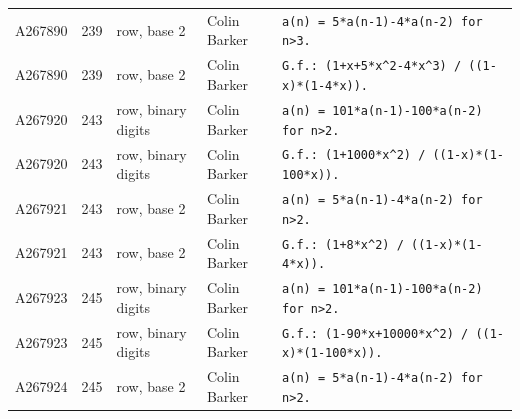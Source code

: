 \documentclass[11pt]{article}
\theoremstyle{definition}
\theoremstyle{remark}
\begin{document}
{\begin{longtable}{p{1.3cm}p{0.7cm}p{2.4cm}p{2.3cm}p{7.3cm}}
A267890 & 239 & row, base 2 & Colin Barker & \texttt{a(n)\allowbreak{} \allowbreak{}=\allowbreak{} \allowbreak{}5*\allowbreak{}a(n-\allowbreak{}1)\allowbreak{}-\allowbreak{}4*\allowbreak{}a(n-\allowbreak{}2)\allowbreak{} \allowbreak{}for \allowbreak{}n>3.} \\
A267890 & 239 & row, base 2 & Colin Barker & \texttt{G.f.: \allowbreak{}(1+\allowbreak{}x+\allowbreak{}5*\allowbreak{}x\^{}2-\allowbreak{}4*\allowbreak{}x\^{}3)\allowbreak{} \allowbreak{}/\allowbreak{} \allowbreak{}((1-\allowbreak{}x)\allowbreak{}*\allowbreak{}(1-\allowbreak{}4*\allowbreak{}x)\allowbreak{})\allowbreak{}.} \\
A267920 & 243 & row, binary digits & Colin Barker & \texttt{a(n)\allowbreak{} \allowbreak{}=\allowbreak{} \allowbreak{}101*\allowbreak{}a(n-\allowbreak{}1)\allowbreak{}-\allowbreak{}100*\allowbreak{}a(n-\allowbreak{}2)\allowbreak{} \allowbreak{}for \allowbreak{}n>2.} \\
A267920 & 243 & row, binary digits & Colin Barker & \texttt{G.f.: \allowbreak{}(1+\allowbreak{}1000*\allowbreak{}x\^{}2)\allowbreak{} \allowbreak{}/\allowbreak{} \allowbreak{}((1-\allowbreak{}x)\allowbreak{}*\allowbreak{}(1-\allowbreak{}100*\allowbreak{}x)\allowbreak{})\allowbreak{}.} \\
A267921 & 243 & row, base 2 & Colin Barker & \texttt{a(n)\allowbreak{} \allowbreak{}=\allowbreak{} \allowbreak{}5*\allowbreak{}a(n-\allowbreak{}1)\allowbreak{}-\allowbreak{}4*\allowbreak{}a(n-\allowbreak{}2)\allowbreak{} \allowbreak{}for \allowbreak{}n>2.} \\
A267921 & 243 & row, base 2 & Colin Barker & \texttt{G.f.: \allowbreak{}(1+\allowbreak{}8*\allowbreak{}x\^{}2)\allowbreak{} \allowbreak{}/\allowbreak{} \allowbreak{}((1-\allowbreak{}x)\allowbreak{}*\allowbreak{}(1-\allowbreak{}4*\allowbreak{}x)\allowbreak{})\allowbreak{}.} \\
A267923 & 245 & row, binary digits & Colin Barker & \texttt{a(n)\allowbreak{} \allowbreak{}=\allowbreak{} \allowbreak{}101*\allowbreak{}a(n-\allowbreak{}1)\allowbreak{}-\allowbreak{}100*\allowbreak{}a(n-\allowbreak{}2)\allowbreak{} \allowbreak{}for \allowbreak{}n>2.} \\
A267923 & 245 & row, binary digits & Colin Barker & \texttt{G.f.: \allowbreak{}(1-\allowbreak{}90*\allowbreak{}x+\allowbreak{}10000*\allowbreak{}x\^{}2)\allowbreak{} \allowbreak{}/\allowbreak{} \allowbreak{}((1-\allowbreak{}x)\allowbreak{}*\allowbreak{}(1-\allowbreak{}100*\allowbreak{}x)\allowbreak{})\allowbreak{}.} \\
A267924 & 245 & row, base 2 & Colin Barker & \texttt{a(n)\allowbreak{} \allowbreak{}=\allowbreak{} \allowbreak{}5*\allowbreak{}a(n-\allowbreak{}1)\allowbreak{}-\allowbreak{}4*\allowbreak{}a(n-\allowbreak{}2)\allowbreak{} \allowbreak{}for \allowbreak{}n>2.} \\

\end{longtable}}
\end{document}
